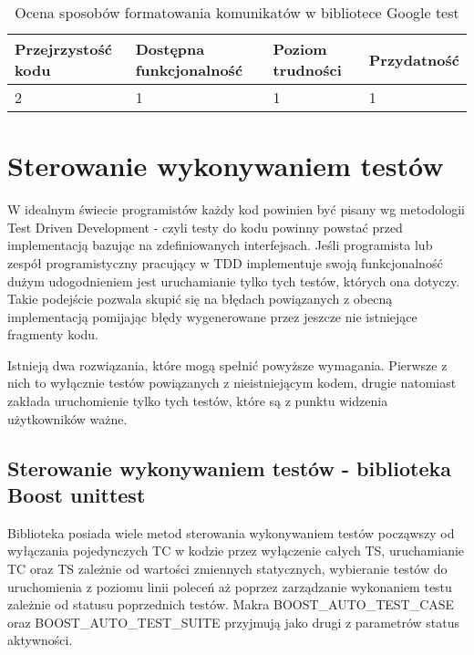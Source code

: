 \documentclass[12pt,a4paper,notitlepage]{report}
\begin{document}
\begin{center}
			\begin{table}[!ht]
			\caption{Ocena sposobów formatowania komunikatów w bibliotece Google test}
			\label{}
			\begin{tabular}[!hc]{|l|l|l|l|}
		\hline
		Przejrzystość kodu 	&	Dostępna funkcjonalność	&	Poziom trudności	&	Przydatność \\ \hline
		2					&	1						&	1					& 	1  			\\ \hline
			\end{tabular}
			\end{table} 
		\end{center}

\section{Sterowanie wykonywaniem testów}

W idealnym świecie programistów każdy kod powinien być pisany wg metodologii Test Driven Development - czyli testy do kodu powinny powstać przed implementacją bazując na zdefiniowanych interfejsach.
Jeśli programista lub zespół programistyczny pracujący w TDD implementuje swoją funkcjonalność dużym udogodnieniem jest uruchamianie tylko tych testów, których ona dotyczy. Takie podejście pozwala skupić się na błędach powiązanych z obecną implementacją pomijając błędy wygenerowane przez jeszcze nie istniejące fragmenty kodu.

Istnieją dwa rozwiązania, które mogą spełnić powyższe wymagania. Pierwsze z nich to wyłącznie testów powiązanych z nieistniejącym kodem, drugie natomiast zakłada uruchomienie tylko tych testów, które są z punktu widzenia użytkowników ważne.

\subsection{Sterowanie wykonywaniem testów - biblioteka Boost unittest}

Biblioteka posiada wiele metod sterowania wykonywaniem testów począwszy od wyłączania pojedynczych TC w kodzie przez wyłączenie całych TS, uruchamianie TC oraz TS zależnie od wartości zmiennych statycznych, wybieranie testów do uruchomienia z poziomu linii poleceń aż poprzez zarządzanie wykonaniem testu zależnie od statusu poprzednich testów.
Makra BOOST{\_}AUTO{\_}TEST{\_}CASE oraz BOOST{\_}AUTO{\_}TEST{\_}SUITE przyjmują jako drugi z parametrów status aktywności.
\end{document}
